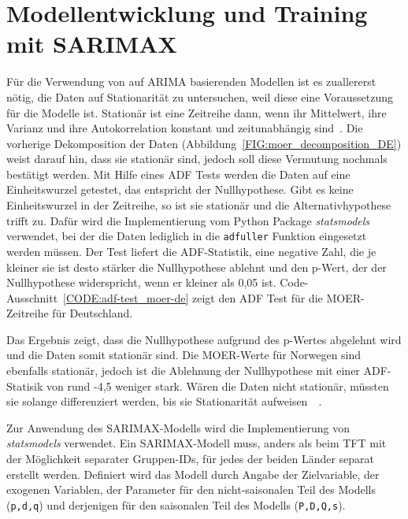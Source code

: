 \section{Modellentwicklung und Training mit SARIMAX}\label{CAP:SARIMAX-training}
Für die Verwendung von auf \ac{ARIMA} basierenden Modellen ist es zuallererst nötig, die Daten auf Stationarität zu untersuchen, weil diese eine Voraussetzung für die Modelle ist.
Stationär ist eine Zeitreihe dann, wenn ihr Mittelwert, ihre Varianz und ihre Autokorrelation konstant und zeitunabhängig sind~\cite{Peixeiro.2022}.
Die vorherige Dekomposition der Daten (Abbildung~\ref{FIG:moer_decomposition_DE}) weist darauf hin, dass sie stationär sind, jedoch soll diese Vermutung nochmals bestätigt werden.
Mit Hilfe eines \ac{ADF} Tests werden die Daten auf eine Einheitswurzel getestet, das entspricht der Nullhypothese.
Gibt es keine Einheitswurzel in der Zeitreihe, so ist sie stationär und die Alternativhypothese trifft zu.
Dafür wird die Implementierung vom Python Package \textit{statsmodels} verwendet, bei der die Daten lediglich in die \lstinline[columns=fixed]{adfuller} Funktion eingesetzt werden müssen.
Der Test liefert die ADF-Statistik, eine negative Zahl, die je kleiner sie ist desto stärker die Nullhypothese ablehnt und den p-Wert, der der Nullhypothese widerspricht, wenn er kleiner als 0,05 ist.
Code-Ausschnitt~\ref{CODE:adf-test_moer-de} zeigt den \ac{ADF} Test für die \ac{MOER}-Zeitreihe für Deutschland.

Das Ergebnis zeigt, dass die Nullhypothese aufgrund des p-Wertes abgelehnt wird und die Daten somit stationär sind.
Die \ac{MOER}-Werte für Norwegen sind ebenfalls stationär, jedoch ist die Ablehnung der Nullhypothese mit einer ADF-Statisik von rund -4,5 weniger stark.
Wären die Daten nicht stationär, müssten sie solange differenziert werden, bis sie Stationarität aufweisen~\cite{Peixeiro.2022}~\cite{Rahmadhan.8.5.2023}.

Zur Anwendung des SARIMAX-Modells wird die Implementierung von \textit{statsmodels} verwendet.
Ein SARIMAX-Modell muss, anders als beim \ac{TFT} mit der Möglichkeit separater Gruppen-IDs, für jedes der beiden Länder separat erstellt werden.
Definiert wird das Modell durch Angabe der Zielvariable, der exogenen Variablen, der Parameter für den nicht-saisonalen Teil des Modells (\lstinline[columns=fixed]{p,d,q}) und derjenigen für den saisonalen Teil des Modells (\lstinline[columns=fixed]{P,D,Q,s}).


